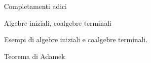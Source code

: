 \begin{example}\label{ex_completamenti_adici}
 Completamenti adici
\end{example}

\begin{example}\label{ex_algebre_iniziali_coalgebre_terminali}
 Algebre iniziali, coalgebre terminali
\end{example}

\begin{examples}\label{exs_algebre_iniziali_coalgebre_terminali}
 Esempi di algebre iniziali e coalgebre terminali.
\end{examples}

\begin{theorem}\label{thm_adamek}
 Teorema di Adamek
\end{theorem}
\begin{esercizi}
 \item
 \item
 \item
 \item
 \item
\end{esercizi}
